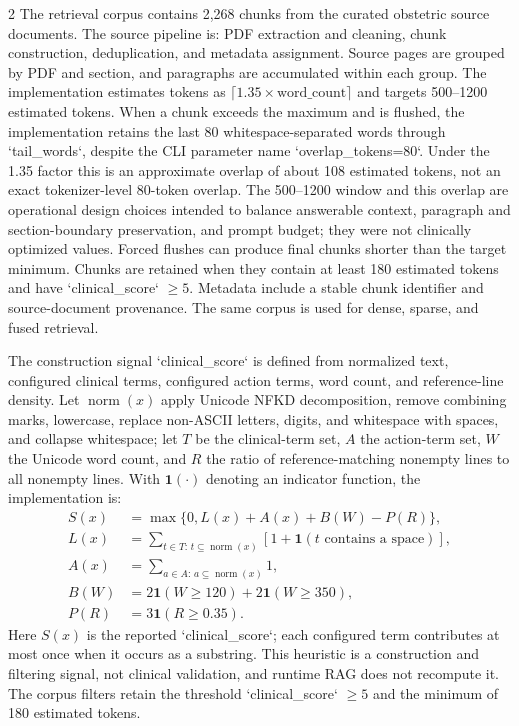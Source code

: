 \documentclass[11pt]{article}
\begin{document}
\begin{multicols}{2}
The retrieval corpus contains 2,268 chunks from the curated obstetric source documents. The source pipeline is: PDF extraction and cleaning, chunk construction, deduplication, and metadata assignment. Source pages are grouped by PDF and section, and paragraphs are accumulated within each group. The implementation estimates tokens as $\lceil 1.35 \times \text{word\_count}\rceil$ and targets 500--1200 estimated tokens. When a chunk exceeds the maximum and is flushed, the implementation retains the last 80 whitespace-separated words through `tail\_words`, despite the CLI parameter name `overlap\_tokens=80`. Under the 1.35 factor this is an approximate overlap of about 108 estimated tokens, not an exact tokenizer-level 80-token overlap. The 500--1200 window and this overlap are operational design choices intended to balance answerable context, paragraph and section-boundary preservation, and prompt budget; they were not clinically optimized values. Forced flushes can produce final chunks shorter than the target minimum. Chunks are retained when they contain at least 180 estimated tokens and have `clinical\_score` $\geq 5$. Metadata include a stable chunk identifier and source-document provenance. The same corpus is used for dense, sparse, and fused retrieval.

The construction signal `clinical\_score` is defined from normalized text, configured clinical terms, configured action terms, word count, and reference-line density. Let $\operatorname{norm}(x)$ apply Unicode NFKD decomposition, remove combining marks, lowercase, replace non-ASCII letters, digits, and whitespace with spaces, and collapse whitespace; let $T$ be the clinical-term set, $A$ the action-term set, $W$ the Unicode word count, and $R$ the ratio of reference-matching nonempty lines to all nonempty lines. With $\mathbf{1}(\cdot)$ denoting an indicator function, the implementation is:
\[
\begin{aligned}
S(x)&=\max\{0,L(x)+A(x)+B(W)-P(R)\},\\
L(x)&=\sum_{t\in T:\,t\subseteq\operatorname{norm}(x)}
      [1+\mathbf{1}(t\text{ contains a space})],\\
A(x)&=\sum_{a\in A:\,a\subseteq\operatorname{norm}(x)}1,\\
B(W)&=2\mathbf{1}(W\geq120)+2\mathbf{1}(W\geq350),\\
P(R)&=3\mathbf{1}(R\geq0.35).
\end{aligned}
\]
Here $S(x)$ is the reported `clinical\_score`; each configured term contributes at most once when it occurs as a substring. This heuristic is a construction and filtering signal, not clinical validation, and runtime RAG does not recompute it. The corpus filters retain the threshold `clinical\_score` $\geq 5$ and the minimum of 180 estimated tokens.


\end{multicols}
\end{document}
